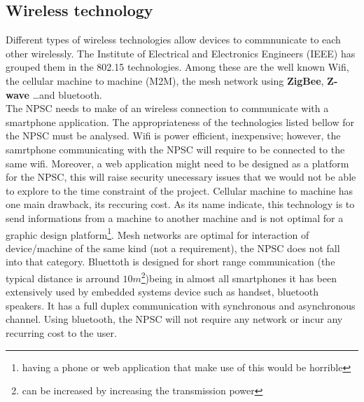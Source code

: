 \subsection{Wireless technology}
Different types of wireless technologies allow devices to commnunicate to each other wirelessly. The Institute of Electrical and Electronics Engineers (IEEE) has grouped them in the 802.15 technologies. Among these are the well known Wifi, the cellular machine to machine (M2M), the mesh network using \textbf{ZigBee}, \textbf{Z-wave} \ldots and bluetooth. \\
The NPSC needs to make of an wireless connection to communicate with a smartphone application. The  appropriateness of the technologies listed bellow for the NPSC must be analysed. 
Wifi is power efficient, inexpensive; however, the samrtphone communicating with the NPSC will require to be connected to the same wifi. Moreover, a web application might need to be designed as a platform for the NPSC, this will raise security unecessary issues that we would not be able to explore to the time constraint of the project. Cellular machine to machine has one main drawback, its reccuring cost. As its name indicate, this technology is to send informations from a machine to another machine and is not optimal for a graphic design platform\footnote{having a phone or web application that make use of this would be horrible}.  Mesh networks are optimal for interaction of device/machine of the same kind (not a requirement), the NPSC does not fall into that category. Bluettoth is designed for short range communication (the typical distance is arround $10m$\footnote{can be increased by increasing the transmission power})being in almost all smartphones it has been extensively used by embedded systems device such as handset, bluetooth speakers. It has a full duplex communication with synchronous and asynchronous channel. Using bluetooth, the NPSC will not require any network or incur any recurring cost to the user. 

